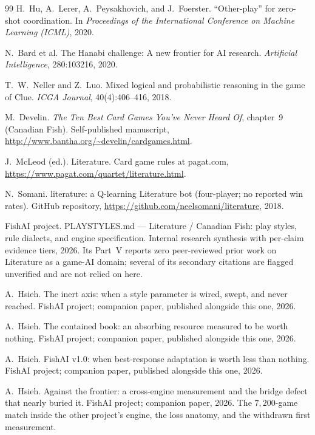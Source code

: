 \documentclass[11pt]{article}
\begin{document}
\begin{thebibliography}{99}
H.~Hu, A.~Lerer, A.~Peysakhovich, and J.~Foerster.
\newblock ``Other-play'' for zero-shot coordination.
\newblock In \emph{Proceedings of the International Conference on Machine Learning (ICML)},
2020.

N.~Bard et al.
\newblock The Hanabi challenge: A new frontier for AI research.
\newblock \emph{Artificial Intelligence}, 280:103216, 2020.

T.~W.~Neller and Z.~Luo.
\newblock Mixed logical and probabilistic reasoning in the game of Clue.
\newblock \emph{ICGA Journal}, 40(4):406--416, 2018.

M.~Develin.
\newblock \emph{The Ten Best Card Games You've Never Heard Of}, chapter~9 (Canadian Fish).
\newblock Self-published manuscript, \url{http://www.bantha.org/~develin/cardgames.html}.

J.~McLeod (ed.).
\newblock Literature.
\newblock Card game rules at pagat.com,
\url{https://www.pagat.com/quartet/literature.html}.

N.~Somani.
\newblock literature: a Q-learning Literature bot (four-player; no reported win rates).
\newblock GitHub repository, \url{https://github.com/neelsomani/literature}, 2018.

FishAI project.
\newblock PLAYSTYLES.md --- Literature / Canadian Fish: play styles, rule dialects, and
engine specification.
\newblock Internal research synthesis with per-claim evidence tiers, 2026. Its Part~V
reports zero peer-reviewed prior work on Literature as a game-AI domain; several of its
secondary citations are flagged unverified and are not relied on here.

A.~Hsieh.
\newblock The inert axis: when a style parameter is wired, swept, and never reached.
\newblock FishAI project; companion paper, published alongside this one, 2026.

A.~Hsieh.
\newblock The contained book: an absorbing resource measured to be worth nothing.
\newblock FishAI project; companion paper, published alongside this one, 2026.

A.~Hsieh.
\newblock FishAI v1.0: when best-response adaptation is worth less than nothing.
\newblock FishAI project; companion paper, published alongside this one, 2026.

A.~Hsieh.
\newblock Against the frontier: a cross-engine measurement and the bridge defect that nearly
  buried it.
\newblock FishAI project; companion paper, 2026. The $7{,}200$-game match inside the other
  project's engine, the loss anatomy, and the withdrawn first measurement.


\end{thebibliography}
\end{document}
